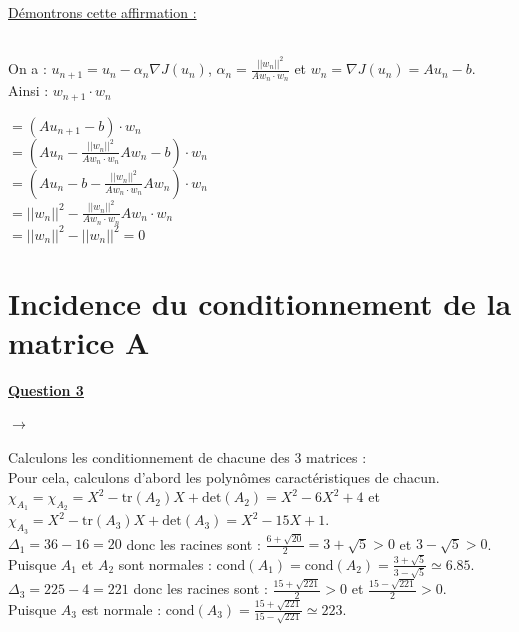 \documentclass[12pt,a4paper]{article}
\begin{document}
	\underline{Démontrons cette affirmation :}\\
	
	$ $ \hspace{1cm} \begin{minipage}{18cm}
		On a : $u_{n+1} = u_n-\alpha_n\nabla J(u_n)$, \hspace{.5cm} $\alpha_n = \frac{|\!|w_n|\!|^2}{Aw_n\cdot w_n}$ et \hspace{.5cm} $w_n = \nabla J(u_n) = Au_n-b$.\\
		
		Ainsi : $w_{n+1} \cdot w_n$ 
		\begin{minipage}[t]{6cm}
			$= \left(Au_{n+1}-b\right)\cdot w_n$\\
			$= \left(Au_n-\frac{|\!|w_n|\!|^2}{Aw_n\cdot w_n}Aw_n-b\right)\cdot w_n$\\
			$=\left( Au_n-b-\frac{|\!|w_n|\!|^2}{Aw_n \cdot w_n}Aw_n\right)\cdot w_n $\\
			$= |\!|w_n|\!|^2-\frac{|\!|w_n|\!|^2}{Aw_n \cdot w_n}Aw_n\cdot w_n$\\
			$= |\!|w_n|\!|^2-|\!|w_n|\!|^2 = 0$
		\end{minipage}
	\end{minipage}
	
	
	
\section{Incidence du conditionnement de la matrice A}

	\textbf{\underline{Question 3}}

	\vspace{.2cm}
	
	$\longrightarrow$ \begin{minipage}[t]{18 cm}Calculons les conditionnement de chacune des 3 matrices :\\
	Pour cela, calculons d'abord les polynômes caractéristiques de chacun.\\
	
	$\chi_{A_1}=\chi_{A_2}=X^2-\text{tr}(A_2)X+\text{det}(A_2) = X^2-6X^2+4$ et $\chi_{A_3} = X^2-\text{tr}(A_3)X+\text{det}(A_3) = X^2-15X+1$.\\
	
	$\Delta_1 = 36-16 = 20$ donc les racines sont : $\frac{6+\sqrt{20}}{2} = 3+\sqrt{5}>0$ et $3-\sqrt{5}>0$.\\
	Puisque $A_1$ et $A_2$ sont normales : $\text{cond}(A_1)=\text{cond}(A_2) = \frac{3+\sqrt{5}}{3-\sqrt{5}} \simeq 6.85$.\\
	
	$\Delta_3 = 225-4 = 221$ donc les racines sont : $\frac{15+\sqrt{221}}{2}>0$ et $\frac{15-\sqrt{221}}{2}>0$.\\
	Puisque $A_3$ est normale : $\text{cond}(A_3)= \frac{15+\sqrt{221}}{15-\sqrt{221}} \simeq 223 $.
	\end{minipage}
	
\end{document}
